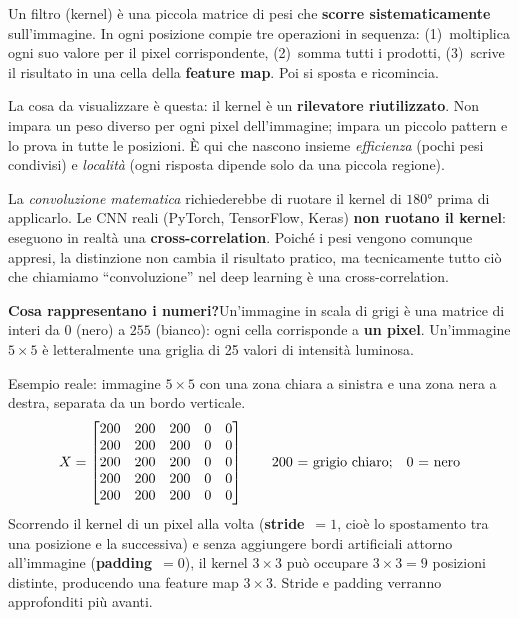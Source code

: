 \documentclass[
  11pt,
]{article}
\begin{document}
Un filtro (kernel) è una piccola matrice di pesi che \textbf{scorre sistematicamente} sull'immagine. In ogni posizione compie tre operazioni in sequenza: (1)~moltiplica ogni suo valore per il pixel corrispondente, (2)~somma tutti i prodotti, (3)~scrive il risultato in una cella della \textbf{feature map}. Poi si sposta e ricomincia.

La cosa da visualizzare è questa: il kernel è un \textbf{rilevatore riutilizzato}. Non impara un peso diverso per ogni pixel dell'immagine; impara un piccolo pattern e lo prova in tutte le posizioni. È qui che nascono insieme \emph{efficienza} (pochi pesi condivisi) e \emph{località} (ogni risposta dipende solo da una piccola regione).

\begin{notabox}[title={\textbf{Convoluzione vs cross-correlation}}]
La \emph{convoluzione matematica} richiederebbe di ruotare il kernel di $180°$ prima di applicarlo. Le CNN reali (PyTorch, TensorFlow, Keras) \textbf{non ruotano il kernel}: eseguono in realtà una \textbf{cross-correlation}. Poiché i pesi vengono comunque appresi, la distinzione non cambia il risultato pratico, ma tecnicamente tutto ciò che chiamiamo ``convoluzione'' nel deep learning è una cross-correlation.
\end{notabox}

\medskip
\textbf{Cosa rappresentano i numeri?}\quad Un'immagine in scala di grigi è una matrice di interi da $0$ (nero) a $255$ (bianco): ogni cella corrisponde a \textbf{un pixel}. Un'immagine $5\times5$ è letteralmente una griglia di 25 valori di intensità luminosa.

Esempio reale: immagine $5\times5$ con una zona chiara a sinistra e una zona nera a destra, separata da un bordo verticale.
\[
X =
\begin{bmatrix}
200 & 200 & 200 & 0 & 0 \\
200 & 200 & 200 & 0 & 0 \\
200 & 200 & 200 & 0 & 0 \\
200 & 200 & 200 & 0 & 0 \\
200 & 200 & 200 & 0 & 0
\end{bmatrix}
\qquad \text{200 = grigio chiaro;\quad 0 = nero}
\]
Scorrendo il kernel di un pixel alla volta (\textbf{stride}~$= 1$, cioè lo spostamento tra una posizione e la successiva) e senza aggiungere bordi artificiali attorno all'immagine (\textbf{padding}~$= 0$), il kernel $3\times3$ può occupare $3\times3 = 9$ posizioni distinte, producendo una feature map $3\times3$. Stride e padding verranno approfonditi più avanti.
\end{document}
